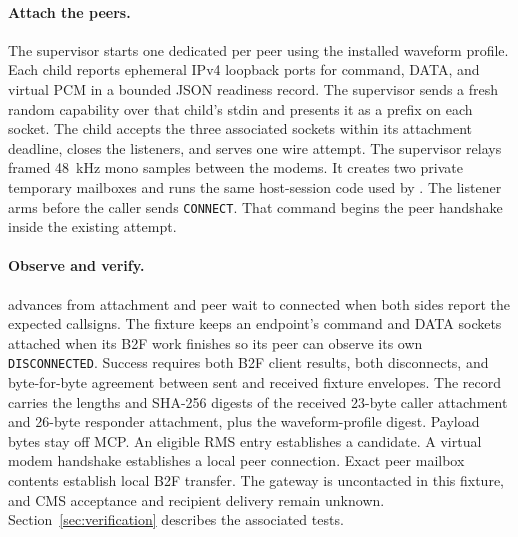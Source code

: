 \begin{samepage}
\paragraph{Attach the peers.}
The supervisor starts one dedicated  per peer using the
installed waveform profile. Each child reports ephemeral IPv4 loopback ports
for command, DATA, and virtual PCM in a bounded JSON readiness record. The
supervisor sends a fresh random capability over that child's stdin and
presents it as a prefix on each socket. The child accepts the three
associated sockets within its attachment deadline, closes the listeners,
and serves one wire attempt. The supervisor relays framed 48~kHz mono
samples between the modems. It creates two private temporary mailboxes
and runs the same host-session code used by . The
listener arms before the caller sends \texttt{CONNECT}. That command begins
the peer handshake inside the existing attempt.
\par
\end{samepage}

\paragraph{Observe and verify.}
 advances from attachment and peer wait to connected
when both sides report the expected callsigns. The fixture keeps an endpoint's
command and DATA sockets attached when its B2F work finishes so its peer can
observe its own \texttt{DISCONNECTED}. Success requires both B2F client
results, both disconnects, and byte-for-byte agreement between sent and received
fixture envelopes. The record carries the lengths and SHA-256 digests of the
received 23-byte caller attachment and 26-byte responder attachment, plus
the waveform-profile digest. Payload bytes stay off MCP. An eligible RMS
entry establishes a candidate. A virtual modem handshake establishes a
local peer connection. Exact peer mailbox contents establish local B2F
transfer. The gateway is uncontacted in this fixture, and CMS acceptance
and recipient delivery remain unknown. Section~\ref{sec:verification}
describes the associated tests.

